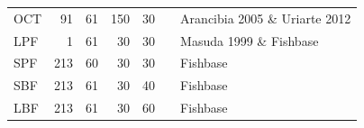 \documentclass[11pt]{article}
\begin{document}
\begin{table}[htb]
\begin{center}
\begin{tabular}{lrrrrll}
 OCT                &           91  &            61  &        150  &           30  &                      &  Arancibia 2005 \&  Uriarte 2012          \\
 LPF                &            1  &            61  &         30  &           30  &                      &  Masuda 1999 \& Fishbase                  \\
 SPF                &          213  &            60  &         30  &           30  &                      &  Fishbase                                 \\
 SBF                &          213  &            61  &         30  &           40  &                      &  Fishbase                                 \\
 LBF                &          213  &            61  &         30  &           60  &                      &  Fishbase                                 \\
\end{tabular}
\end{center}
\end{table}
\end{document}
